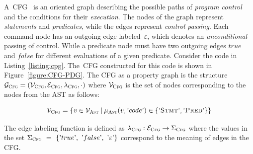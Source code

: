 A~CFG~\cite{CPG-yamaguchi2014modeling} is an oriented graph describing the possible paths of \textit{program control} and the conditions for their \textit{execution}. The nodes of the graph represent \textit{statements} and \textit{predicates}, while the edges represent \textit{control passing}. Each command node has an outgoing edge labeled~$\varepsilon$, which denotes an \textit{unconditional} passing of control. While a predicate node must have two outgoing edges $true$ and $false$ for different evaluations of a given predicate. Consider the code in Listing~\ref{listing:cpg}. The~CFG constructed for this code is shown in Figure~\ref{figure:CFG-PDG}. The CFG as a property graph is the structure $\mathcal{G}_{\textsc{Cfg}} = ( \mathcal{V}_{\textsc{Cfg}}, \mathcal{E}_{\textsc{Cfg}}, \lambda_{\textsc{Cfg}}, \cdot )$ where $\mathcal{V}_{\textsc{Cfg}}$ is the set of nodes corresponding to the nodes from the AST as follows:

\begin{equation*}
\mathcal{V}_{\textsc{Cfg}} = \{\mathit{v} \in \mathcal{V}_{\textsc{Ast}} \: | \: \mu_{\textsc{Ast}}(v, \textrm'code\textrm') \in \{\textrm'\textsc{Stmt}\textrm', \textrm'\textsc{Pred}\textrm'\} \}
\end{equation*}

The edge labeling function is defined as $\lambda_{\textsc{Cfg}} : \mathcal{E}_{\textsc{Cfg}} \rightarrow \Sigma_{\textsc{Cfg}}$ where the values in the set $\Sigma_{\textsc{Cfg}}~=~\{\textrm'true\textrm',~\textrm'false\textrm',~\textrm'\varepsilon\textrm'\}$ correspond to the meaning of edges in the CFG.

